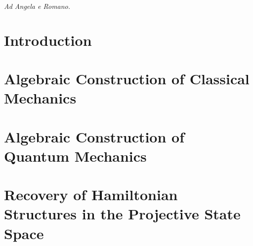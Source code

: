 



\frontmatter



\cleardoublepage
\thispagestyle{empty}
\vspace*{0.2\textheight}
\begin{flushright}
	\textit{Ad Angela e Romano.}
\end{flushright}
\vfill
\cleardoublepage


\tableofcontents

\setlength{\headwidth}{\textwidth}

\mainmatter
\chapter*{Introduction}

\chapter{Algebraic Construction of Classical Mechanics}\label{cap:cm-c-star}




\chapter{Algebraic Construction of Quantum Mechanics}\label{cap:qm-algebraic}



\chapter{Recovery of Hamiltonian Structures in the Projective State Space}\label{cap:kahler}




\backmatter
\printbibliography

